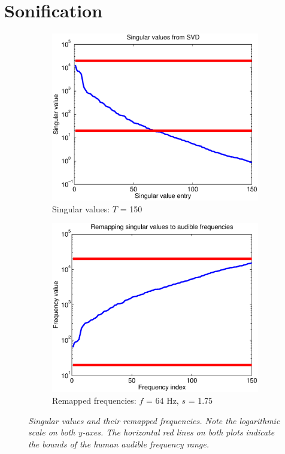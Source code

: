 \section*{Sonification}

\begin{figure}
	\begin{subfigure}[h]{0.5\textwidth}
		\includegraphics[width=\textwidth]{chap5/figures/singulars.eps}
		\caption{Singular values: $T$ = 150} 
		\label{fig:singulars}
	\end{subfigure}
	\begin{subfigure}[h]{0.5\textwidth}
		\includegraphics[width=\textwidth]{chap5/figures/remap_freqs.eps}
		\caption{Remapped frequencies: $f$ = 64 Hz, $s$ = 1.75}
		\label{fig:freqs}
	\end{subfigure}
	\caption{\em Singular values and their remapped frequencies. Note the logarithmic scale on both y-axes. The horizontal red lines on both plots indicate the bounds of the human audible frequency range.}
\end{figure}

